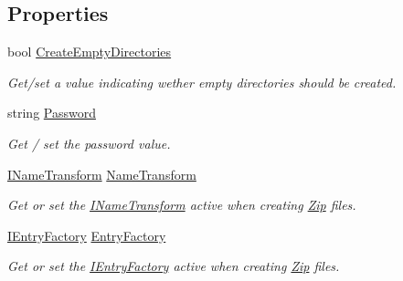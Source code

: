 \subsection*{Properties}
\begin{DoxyCompactItemize}
\item 
bool \hyperlink{class_i_c_sharp_code_1_1_sharp_zip_lib_1_1_zip_1_1_fast_zip_a9b97432b0a97d63d9afd8fa32ec4f404}{Create\+Empty\+Directories}
\begin{DoxyCompactList}\small\item\em Get/set a value indicating wether empty directories should be created. \end{DoxyCompactList}\item 
string \hyperlink{class_i_c_sharp_code_1_1_sharp_zip_lib_1_1_zip_1_1_fast_zip_a4fd9260c1167bd5485e5487d107de282}{Password}
\begin{DoxyCompactList}\small\item\em Get / set the password value. \end{DoxyCompactList}\item 
\hyperlink{interface_i_c_sharp_code_1_1_sharp_zip_lib_1_1_core_1_1_i_name_transform}{I\+Name\+Transform} \hyperlink{class_i_c_sharp_code_1_1_sharp_zip_lib_1_1_zip_1_1_fast_zip_a3bb53e24dbd994e3eba5876b2aaca11f}{Name\+Transform}
\begin{DoxyCompactList}\small\item\em Get or set the \hyperlink{}{I\+Name\+Transform} active when creating \hyperlink{namespace_i_c_sharp_code_1_1_sharp_zip_lib_1_1_zip}{Zip} files. \end{DoxyCompactList}\item 
\hyperlink{interface_i_c_sharp_code_1_1_sharp_zip_lib_1_1_zip_1_1_i_entry_factory}{I\+Entry\+Factory} \hyperlink{class_i_c_sharp_code_1_1_sharp_zip_lib_1_1_zip_1_1_fast_zip_a2f3c4303690d4773faaaef7ff6e20762}{Entry\+Factory}
\begin{DoxyCompactList}\small\item\em Get or set the \hyperlink{interface_i_c_sharp_code_1_1_sharp_zip_lib_1_1_zip_1_1_i_entry_factory}{I\+Entry\+Factory} active when creating \hyperlink{namespace_i_c_sharp_code_1_1_sharp_zip_lib_1_1_zip}{Zip} files. \end{DoxyCompactList}\item 

\end{DoxyCompactItemize}
